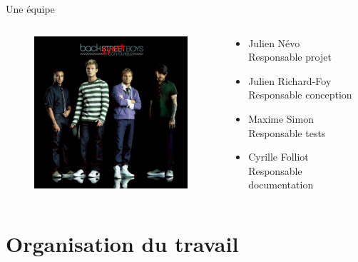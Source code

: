 \documentclass[frenchb]{beamer}
\begin{document}
\begin{frame}{Une équipe}
    \begin{columns}
        \begin{column}[l]{7cm}
            \begin{figure}
                \includegraphics[width=6cm ]{../img/png/back.jpg}
            \end{figure}
        \end{column}
    \begin{column}[l]{9cm}
    \begin{itemize}  
        \item Julien Névo\\\tiny{Responsable projet}\normalsize
        \item Julien Richard-Foy\\\tiny{Responsable conception}\normalsize
        \item Maxime Simon\\\tiny{Responsable tests}\normalsize
        \item Cyrille Folliot\\\tiny{Responsable documentation}\normalsize
    \end{itemize}
    \end{column}
    \end{columns}
\end{frame}

\section{Organisation du travail}
\end{document}
